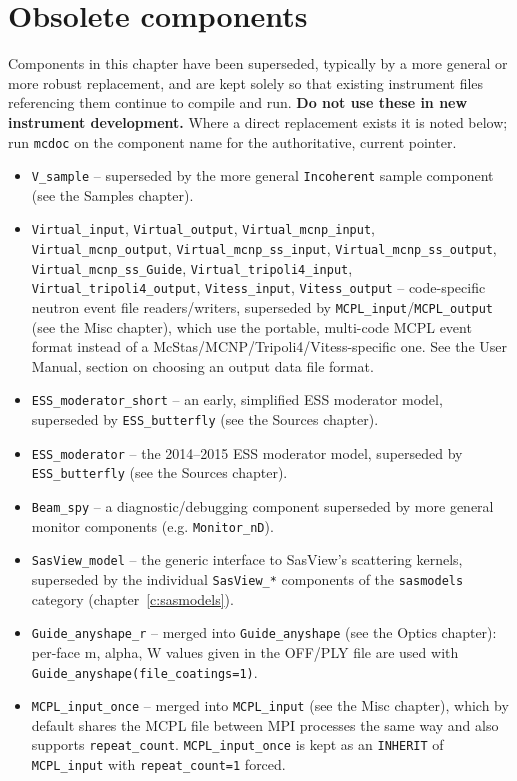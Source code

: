 
\chapter{Obsolete components}
\label{c:obsolete}

Components in this chapter have been superseded, typically by a more
general or more robust replacement, and are kept solely so that existing
instrument files referencing them continue to compile and run. \textbf{Do
not use these in new instrument development.} Where a direct replacement
exists it is noted below; run \verb+mcdoc+ on the component name for the
authoritative, current pointer.

\begin{itemize}
\item \texttt{V\_sample} -- superseded by the more general
  \texttt{Incoherent} sample component (see the Samples chapter).
\item \texttt{Virtual\_input}, \texttt{Virtual\_output},
  \texttt{Virtual\_mcnp\_input}, \texttt{Virtual\_mcnp\_output},
  \texttt{Virtual\_mcnp\_ss\_input}, \texttt{Virtual\_mcnp\_ss\_output},
  \texttt{Virtual\_mcnp\_ss\_Guide}, \texttt{Virtual\_tripoli4\_input},
  \texttt{Virtual\_tripoli4\_output}, \texttt{Vitess\_input},
  \texttt{Vitess\_output} -- code-specific neutron event file readers/writers,
  superseded by \texttt{MCPL\_input}/\texttt{MCPL\_output} (see the Misc
  chapter), which use the portable, multi-code MCPL event format instead of
  a McStas/MCNP/Tripoli4/Vitess-specific one. See the User Manual, section
  on choosing an output data file format.
\item \texttt{ESS\_moderator\_short} -- an early, simplified ESS moderator
  model, superseded by \texttt{ESS\_butterfly} (see the Sources chapter).
\item \texttt{ESS\_moderator} -- the 2014--2015 ESS moderator model,
  superseded by \texttt{ESS\_butterfly} (see the Sources chapter).
\item \texttt{Beam\_spy} -- a diagnostic/debugging component superseded by
  more general monitor components (e.g. \texttt{Monitor\_nD}).
\item \texttt{SasView\_model} -- the generic interface to SasView's
  scattering kernels, superseded by the individual \texttt{SasView\_*}
  components of the \texttt{sasmodels} category (chapter~\ref{c:sasmodels}).
\item \texttt{Guide\_anyshape\_r} -- merged into \texttt{Guide\_anyshape}
  (see the Optics chapter): per-face m, alpha, W values given in the OFF/PLY
  file are used with \texttt{Guide\_anyshape(file\_coatings=1)}.
\item \texttt{MCPL\_input\_once} -- merged into \texttt{MCPL\_input}
  (see the Misc chapter), which by default shares the MCPL file between
  MPI processes the same way and also supports \texttt{repeat\_count}.
  \texttt{MCPL\_input\_once} is kept as an \texttt{INHERIT} of
  \texttt{MCPL\_input} with \texttt{repeat\_count=1} forced.
\end{itemize}

